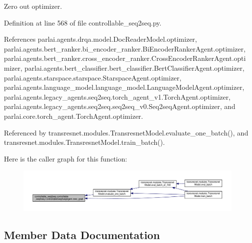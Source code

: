 \begin{DoxyVerb}Zero out optimizer.\end{DoxyVerb}
 

Definition at line 568 of file controllable\+\_\+seq2seq.\+py.



References parlai.\+agents.\+drqa.\+model.\+Doc\+Reader\+Model.\+optimizer, parlai.\+agents.\+bert\+\_\+ranker.\+bi\+\_\+encoder\+\_\+ranker.\+Bi\+Encoder\+Ranker\+Agent.\+optimizer, parlai.\+agents.\+bert\+\_\+ranker.\+cross\+\_\+encoder\+\_\+ranker.\+Cross\+Encoder\+Ranker\+Agent.\+optimizer, parlai.\+agents.\+bert\+\_\+classifier.\+bert\+\_\+classifier.\+Bert\+Classifier\+Agent.\+optimizer, parlai.\+agents.\+starspace.\+starspace.\+Starspace\+Agent.\+optimizer, parlai.\+agents.\+language\+\_\+model.\+language\+\_\+model.\+Language\+Model\+Agent.\+optimizer, parlai.\+agents.\+legacy\+\_\+agents.\+seq2seq.\+torch\+\_\+agent\+\_\+v1.\+Torch\+Agent.\+optimizer, parlai.\+agents.\+legacy\+\_\+agents.\+seq2seq.\+seq2seq\+\_\+v0.\+Seq2seq\+Agent.\+optimizer, and parlai.\+core.\+torch\+\_\+agent.\+Torch\+Agent.\+optimizer.



Referenced by transresnet.\+modules.\+Transresnet\+Model.\+evaluate\+\_\+one\+\_\+batch(), and transresnet.\+modules.\+Transresnet\+Model.\+train\+\_\+batch().

Here is the caller graph for this function\+:
\nopagebreak
\begin{figure}[H]
\begin{center}
\leavevmode
\includegraphics[width=350pt]{classcontrollable__seq2seq_1_1controllable__seq2seq_1_1ControllableSeq2seqAgent_aef0ce4355736782b861b06407d5de115_icgraph}
\end{center}
\end{figure}


\subsection{Member Data Documentation}
\mbox{\label{classcontrollable__seq2seq_1_1controllable__seq2seq_1_1ControllableSeq2seqAgent_a8b11887c42ebcbe81c7d05bce71887b3}} 
